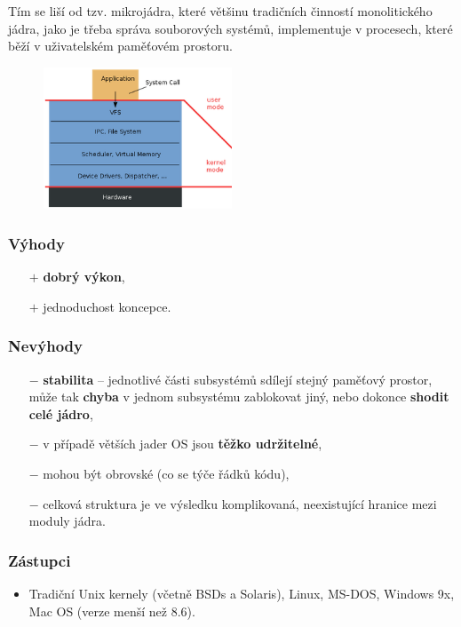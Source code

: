 Tím se liší od tzv. mikrojádra, které většinu tradičních činností monolitického jádra, jako je třeba správa souborových systémů, implementuje v procesech, které běží v uživatelském paměťovém prostoru.
\begin{figure}[H]
	\includegraphics[width=0.5\textwidth,center]{assets/3_mon_os}
\end{figure}

\subsubsection*{Výhody}
\begin{itemize}
	\item[$+$] \textbf{dobrý výkon},
	\item[$+$] jednoduchost koncepce.
\end{itemize}
\subsubsection*{Nevýhody}
\begin{itemize}
	\item[$-$] \textbf{stabilita} -- jednotlivé části subsystémů sdílejí stejný paměťový prostor, může tak \textbf{chyba} v jednom subsystému zablokovat jiný, nebo dokonce \textbf{shodit celé jádro},
	\item[$-$] v případě větších jader OS jsou \textbf{těžko udržitelné},
	\item[$-$] mohou být obrovské (co se týče řádků kódu),
	\item[$-$] celková struktura je ve výsledku komplikovaná, neexistující hranice mezi moduly jádra.
\end{itemize}
\subsubsection*{Zástupci}
\begin{itemize}
\item Tradiční Unix kernely (včetně BSDs a Solaris), Linux, MS-DOS, Windows 9x, Mac OS (verze menší než 8.6).
\end{itemize}

